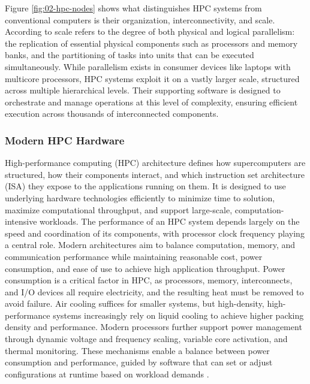 Figure \ref{fig:02-hpc-nodes} shows what distinguishes HPC systems from conventional computers is their organization, interconnectivity, and scale. According to \cite{STERLING201843} scale refers to the degree of both physical and logical parallelism: the replication of essential physical components such as processors and memory banks, and the partitioning of tasks into units that can be executed simultaneously. While parallelism exists in consumer devices like laptops with multicore processors, HPC systems exploit it on a vastly larger scale, structured across multiple hierarchical levels. Their supporting software is designed to orchestrate and manage operations at this level of complexity, ensuring efficient execution across thousands of interconnected components.

\subsubsection{Modern HPC Hardware}
\label{sec:background_hpc_hardware}

High-performance computing (HPC) architecture defines how supercomputers are structured, how their components interact, and which instruction set architecture (ISA) they expose to the applications running on them. It is designed to use underlying hardware technologies efficiently to minimize time to solution, maximize computational throughput, and support large-scale, computation-intensive workloads.
The performance of an HPC system depends largely on the speed and coordination of its components, with processor clock frequency playing a central role. Modern architectures aim to balance computation, memory, and communication performance while maintaining reasonable cost, power consumption, and ease of use to achieve high application throughput.
Power consumption is a critical factor in HPC, as processors, memory, interconnects, and I/O devices all require electricity, and the resulting heat must be removed to avoid failure. Air cooling suffices for smaller systems, but high-density, high-performance systems increasingly rely on liquid cooling to achieve higher packing density and performance. Modern processors further support power management through dynamic voltage and frequency scaling, variable core activation, and thermal monitoring. These mechanisms enable a balance between power consumption and performance, guided by software that can set or adjust configurations at runtime based on workload demands \cite{STERLING201843}.

